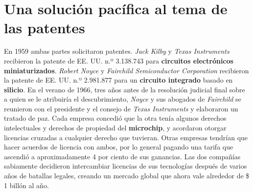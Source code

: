 \section{Una solución pacífica al tema de las patentes}
En 1959 ambas partes solicitaron patentes. \emph{Jack Kilby} y \emph{Texas Instruments} recibieron la patente de EE. UU. n.º 3.138.743 para \textbf{circuitos
electrónicos miniaturizados}. \emph{Robert Noyce} y \emph{Fairchild Semiconductor Corporation} recibieron la patente de EE. UU. n.º 2.981.877 para un \textbf
{circuito integrado} basado en \textbf{silicio}. En el verano de 1966, tres años antes de la resolución judicial final sobre a quien se le atribuiría el 
descubrimiento, \emph{Noyce} y sus abogados de \emph{Fairchild} se reunieron con el presidente y el consejo de \emph{Texas Instruments} y elaboraron un tratado
de paz. Cada empresa concedió que la otra tenía algunos derechos intelectuales y derechos de propiedad del \textbf{microchip}, y acordaron otorgar licencias
cruzadas a cualquier derecho que tuvieran. Otras empresas tendrían que hacer acuerdos de licencia con ambos, por lo general pagando una tarifa que ascendió
a aproximadamente 4 por ciento de sus ganancias. Las dos compañías sabiamente decidieron intercambiar licencias de sus tecnologías después de varios años de
batallas legales, creando un mercado global que ahora vale alrededor de \$ 1 billón al año. \\ 

